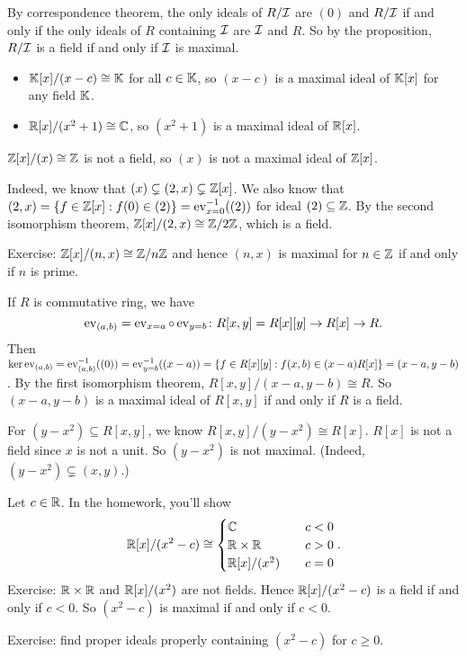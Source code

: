 \documentclass[12pt,letterpaper]{report}
\begin{document}
\begin{thmproof}
  By correspondence theorem, the only ideals of $R/\mathcal{I}$ are $(0)$ and $R/\mathcal{I}$ if and only if
  the only ideals of $R$ containing $\mathcal{I}$ are $\mathcal{I}$ and $R$.
  So by the proposition, $R/\mathcal{I}$ is a field if and only if $\mathcal{I}$ is maximal.
\end{thmproof}

\begin{ex}
  \begin{itemize}
    \item $\mathbb{K}[x]/(x - c) \cong \mathbb{K}$ for all $c \in \mathbb{K}$, so $(x - c)$ is a
      maximal ideal of $\mathbb{K}[x]$ for any field $\mathbb{K}$.
    \item $\mathbb{R}[x]/(x^2 + 1) \cong \mathbb{C}$, so $(x^2 + 1)$ is a maximal ideal of $\mathbb{R}[x]$.
  \end{itemize}
\end{ex}

\begin{ex}
  $\mathbb{Z}[x]/(x) \cong \mathbb{Z}$ is not a field, so $(x)$ is not a maximal ideal of $\mathbb{Z}[x]$.

  Indeed, we know that $(x) \subsetneq (2, x) \subsetneq \mathbb{Z}[x]$.
  We also know that $(2, x) = \{f \in \mathbb{Z}[x] : f(0) \in (2)\} = \operatorname{ev}_{x = 0}^{-1}((2))$ for ideal
  $(2) \subseteq \mathbb{Z}$.
  By the second isomorphism theorem, $\mathbb{Z}[x]/(2, x) \cong \mathbb{Z}/{2}\mathbb{Z}$, which is a field.

  Exercise: $\mathbb{Z}[x]/(n, x) \cong \mathbb{Z}/{n}\mathbb{Z}$ and hence $(n, x)$ is maximal for $n \in \mathbb{Z}$ if and only
  if $n$ is prime.
\end{ex}

\begin{ex}
  If $R$ is commutative ring, we have
  \[
    \operatorname{ev}_{(a, b)} = \operatorname{ev}_{x = a} \circ \operatorname{ev}_{y = b} \colon R[x, y] = R[x][y] \to R[x] \to R.
  \]
  Then $\ker\operatorname{ev}_{(a, b)} = \operatorname{ev}_{(a, b)}^{-1}((0)) = \operatorname{ev}_{y = b}^{-1}((x - a))
    = \{f \in R[x][y] : f(x, b) \in (x - a)R[x]\} = (x - a, y - b)$.
  By the first isomorphism theorem, $R[x, y]/(x - a, y - b) \cong R$.
  So $(x - a, y - b)$ is a maximal ideal of $R[x, y]$ if and only if $R$ is a field.

  For $(y - x^2) \subseteq R[x, y]$, we know $R[x, y]/(y - x^2) \cong R[x]$.
  $R[x]$ is not a field since $x$ is not a unit.
  So $(y - x^2)$ is not maximal.
  (Indeed, $(y - x^2) \subsetneq (x, y)$.)
\end{ex}

\begin{ex}
  Let $c \in \mathbb{R}$.
  In the homework, you'll show
  \[
    \mathbb{R}[x]/(x^2 - c) \cong \begin{cases}
      \mathbb{C} & c < 0 \\
      \mathbb{R} \times \mathbb{R} & c > 0 \\
      \mathbb{R}[x]/(x^2) \quad & c = 0
    \end{cases}.
  \]
  Exercise: $\mathbb{R} \times \mathbb{R}$ and $\mathbb{R}[x]/(x^2)$ are not fields.
  Hence $\mathbb{R}[x]/(x^2 - c)$ is a field if and only if $c < 0$.
  So $(x^2 - c)$ is maximal if and only if $c < 0$.

  Exercise: find proper ideals properly containing $(x^2 - c)$ for $c \geq 0$.
\end{ex}
\end{document}
